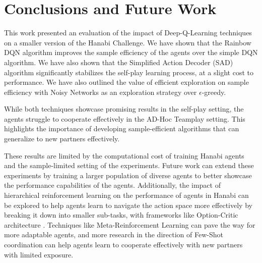\section{Conclusions and Future Work}
\label{sec:conclusion}
This work presented an evaluation of the impact of Deep-Q-Learning techniques on a smaller version of the Hanabi Challenge. We have shown that the Rainbow DQN algorithm improves the sample efficiency of the agents over the simple DQN algorithm. We have also shown that the Simplified Action Decoder (SAD) algorithm significantly stabilizes the self-play learning process, at a slight cost to performance. We have also outlined the value of efficient exploration on sample efficiency with Noisy Networks as an exploration strategy over $\epsilon$-greedy.

While both techniques showcase promising results in the self-play setting, the agents struggle to cooperate effectively in the AD-Hoc Teamplay setting. This highlights the importance of developing sample-efficient algorithms that can generalize to new partners effectively.

These results are limited by the computational cost of training Hanabi agents and the sample-limited setting of the experiments. Future work can extend these experiments by training a larger population of diverse agents to better showcase the performance capabilities of the agents. Additionally, the impact of hierarchical reinforcement learning \cite{vezhnevetsFeUdalNetworksHierarchical2017} on the performance of agents in Hanabi can be explored to help agents learn to navigate the action space more effectively by breaking it down into smaller sub-tasks, with frameworks like Option-Critic architecture \cite{baconOptionCriticArchitecture2016}. Techniques like Meta-Reinforcement \cite{beckSurveyMetaReinforcementLearning2024} Learning can pave the way for more adaptable agents, and more research in the direction of Few-Shot coordination \cite{nekoeiFewshotCoordinationRevisiting2023} can help agents learn to cooperate effectively with new partners with limited exposure.

